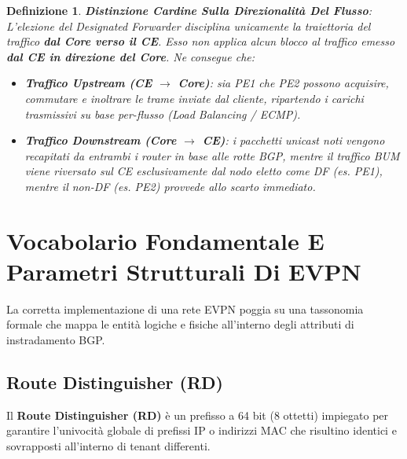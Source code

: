 \documentclass[11pt, a4paper]{article}
\newtheorem{theorem}{Definizione}
\begin{document}
\begin{theorem}
\textbf{Distinzione Cardine Sulla Direzionalità Del Flusso}:
L'elezione del Designated Forwarder disciplina unicamente la traiettoria del traffico \textbf{dal Core verso il CE}. Esso non applica alcun blocco al traffico emesso \textbf{dal CE in direzione del Core}. Ne consegue che:
\begin{itemize}[noitemsep]
    \item \textbf{Traffico Upstream (CE $\to$ Core)}: sia PE1 che PE2 possono acquisire, commutare e inoltrare le trame inviate dal cliente, ripartendo i carichi trasmissivi su base per-flusso (\emph{Load Balancing} / ECMP).
    \item \textbf{Traffico Downstream (Core $\to$ CE)}: i pacchetti unicast noti vengono recapitati da entrambi i router in base alle rotte BGP, mentre il traffico BUM viene riversato sul CE esclusivamente dal nodo eletto come DF (es. PE1), mentre il non-DF (es. PE2) provvede allo scarto immediato.
\end{itemize}
\end{theorem}


\section{Vocabolario Fondamentale E Parametri Strutturali Di EVPN}

La corretta implementazione di una rete EVPN poggia su una tassonomia formale che mappa le entità logiche e fisiche all'interno degli attributi di instradamento BGP.

\subsection{Route Distinguisher (RD)}

Il \textbf{Route Distinguisher (RD)} è un prefisso a 64 bit (8 ottetti) impiegato per garantire l'univocità globale di prefissi IP o indirizzi MAC che risultino identici e sovrapposti all'interno di tenant differenti.

\end{document}
